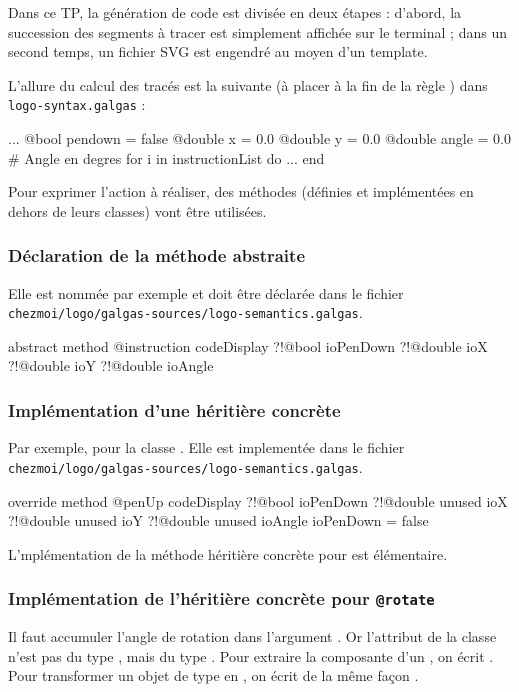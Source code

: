 Dans ce TP, la génération de code est divisée en deux étapes : d'abord, la succession des segments à tracer est simplement affichée sur le terminal ; dans un second temps, un fichier SVG est engendré au moyen d'un template.

L'allure du calcul des tracés est la suivante (à placer à la fin de la règle ) dans \texttt{logo-syntax.galgas} :

\begin{galgascode}
  ...
  @bool pendown = false
  @double x = 0.0
  @double y = 0.0
  @double angle = 0.0 # Angle en degres
  for i in instructionList do
    ...
  end
\end{galgascode}

Pour exprimer l'action à réaliser, des méthodes (définies et implémentées en dehors de leurs classes) vont être utilisées.

\subsubsection{Déclaration de la méthode abstraite}
Elle est nommée par exemple  et doit être déclarée dans le fichier \texttt{chezmoi/logo/galgas-sources/logo-semantics.galgas}.

\begin{galgascode}
abstract method @instruction codeDisplay
  ?!@bool ioPenDown
  ?!@double ioX
  ?!@double ioY
  ?!@double ioAngle
\end{galgascode}

\subsubsection{Implémentation d'une héritière concrète}
Par exemple, pour la classe . Elle est implementée dans le fichier \texttt{chezmoi/logo/galgas-sources\-/logo-semantics.galgas}.

\begin{galgascode}
override method @penUp codeDisplay
  ?!@bool ioPenDown
  ?!@double unused ioX
  ?!@double unused ioY
  ?!@double unused ioAngle
{
  ioPenDown = false
}
\end{galgascode}

L'mplémentation de la méthode héritière concrète pour  est élémentaire.

\subsubsection{Implémentation de l'héritière concrète pour \texttt{@rotate}}
Il faut accumuler l'angle de rotation dans l'argument . Or l'attribut  de la classe  n'est pas du type , mais du type . Pour extraire la composante  d’un , on écrit . Pour transformer un objet  de type  en , on écrit de la même façon . 


